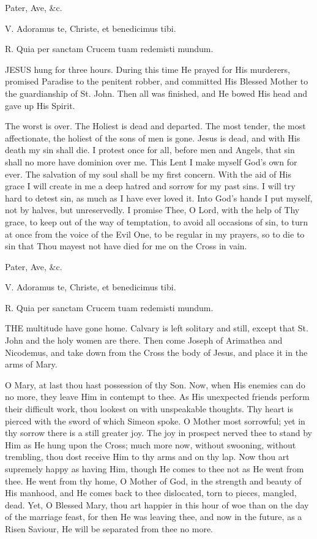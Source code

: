 Pater, Ave, \&c.


V. Adoramus te, Christe, et
benedicimus tibi.

R. Quia per sanctam Crucem tuam redemisti mundum.

JESUS hung for three
hours. During this time He prayed for His murderers, promised Paradise
to the penitent robber, and committed His Blessed Mother to the
guardianship of St. John. Then all was finished, and He bowed His head
and gave up His Spirit.

The worst is over. The Holiest
is dead and departed. The most tender, the most affectionate, the
holiest of the sons of men is gone. Jesus is dead, and with His death my
sin shall die. I protest once for all, before men and Angels, that sin
shall no more have dominion over me. This Lent I make myself God's own
for ever. The salvation of my soul shall be my first concern. With the
aid of His grace I will create in me a deep hatred and sorrow for my
past sins. I will try hard to detest sin, as much as I have ever loved
it. Into God's hands I put myself, not by halves, but unreservedly. I
promise Thee, O Lord, with the help of Thy grace, to keep out of the way
of temptation, to avoid all occasions of sin, to turn at once from the
voice of the Evil One, to be regular in my prayers, so to die to sin
that Thou mayest not have died for me on the Cross in vain.

Pater, Ave, \&c.


V. Adoramus te, Christe, et
benedicimus tibi.

R. Quia per sanctam Crucem tuam redemisti mundum.

THE multitude have
gone home. Calvary is left solitary and still, except that St. John and
the holy women are there. Then come Joseph of Arimathea and Nicodemus,
and take down from the Cross the body of Jesus, and place it in the arms
of Mary.

O Mary, at last thou hast
possession of thy Son. Now, when His enemies can do no more, they leave
Him in contempt to thee. As His unexpected friends perform their
difficult work, thou lookest on with unspeakable thoughts. Thy heart is
pierced with the sword of which Simeon spoke. O Mother most sorrowful;
yet in thy sorrow there is a still greater joy. The joy in prospect
nerved thee to stand by Him as He hung upon the Cross; much more now,
without swooning, without trembling, thou dost receive Him to thy arms
and on thy lap. Now thou art supremely happy as having Him, though He
comes to thee not as He went from thee. He went from thy home, O Mother
of God, in the strength and beauty of His manhood, and He comes back to
thee dislocated, torn to pieces, mangled, dead. Yet, O Blessed Mary,
thou art happier in this hour of woe than on the day of the
marriage feast, for then He was leaving thee, and now in the future, as
a Risen Saviour, He will be separated from thee no more.


